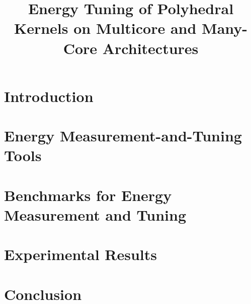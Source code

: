 \documentclass[10pt,conference,letterpaper]{IEEEtran}
\title{Energy Tuning of Polyhedral Kernels on Multicore and Many-Core Architectures}
\author{}
\begin{document}
\maketitle



\section{Introduction}
\label{sec:intro}


\section{Energy Measurement-and-Tuning Tools}
\label{sec:tools}


\section{Benchmarks for Energy Measurement and Tuning}
\label{sec:benchmarks}


%

\section{Experimental Results}
\label{sec:results}


%

\section {Conclusion}
\label{sec:conclusion}






\end{document}
